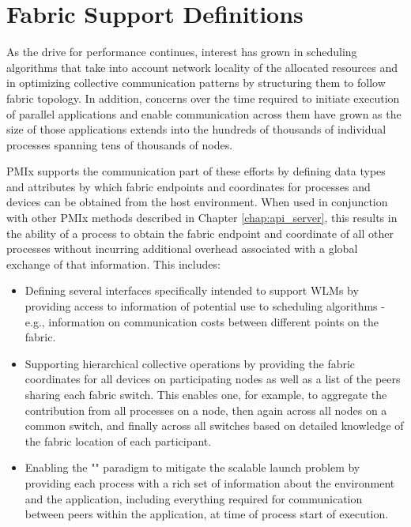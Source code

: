 \chapter{Fabric Support Definitions}
\label{chap:api_fabric}

As the drive for performance continues, interest has grown in scheduling algorithms that take into account network locality of the allocated resources and in optimizing collective communication patterns by structuring them to follow fabric topology. In addition, concerns over the time required to initiate execution of parallel applications and enable communication across them have grown as the size of those applications extends into the hundreds of thousands of individual processes spanning tens of thousands of nodes.

\ac{PMIx} supports the communication part of these efforts by defining data types and attributes by which fabric endpoints and coordinates for processes and devices can be obtained from the host environment. When used in conjunction with other \ac{PMIx} methods described in Chapter \ref{chap:api_server}, this results in the ability of a process to obtain the fabric endpoint and coordinate of all other processes without incurring additional overhead associated with a global exchange of that information. This includes:

\begin{itemize}
	\item Defining several interfaces specifically intended to support \acp{WLM} by providing access to information of potential use to scheduling algorithms - e.g., information on communication costs between different points on the fabric.

	\item Supporting hierarchical collective operations by providing the fabric coordinates for all devices on participating nodes as well as a list of the peers sharing each fabric switch. This enables one, for example, to aggregate the contribution from all processes on a node, then again across all nodes on a common switch, and finally across all switches based on detailed knowledge of the fabric location of each participant.

	\item Enabling the "" paradigm to mitigate the scalable launch problem by providing each process with a rich set of information about the environment and the application, including everything required for communication between peers within the application, at time of process start of execution.

\end{itemize}

